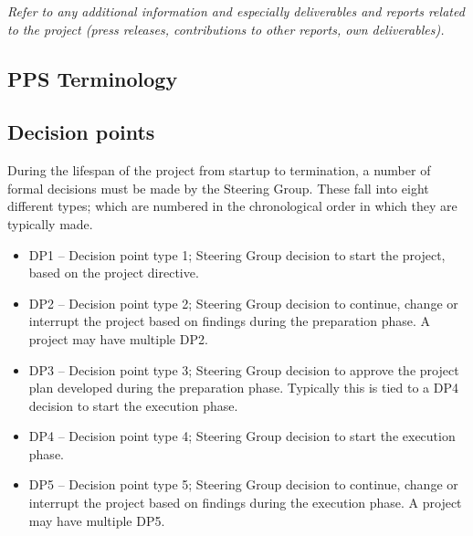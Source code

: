 \documentclass{article}
\begin{document}

\newpage
{\it Refer to any additional information and especially deliverables and reports related to the project (press releases, contributions to other reports, own deliverables).}
{}


\newpage
\begin{appendices}
\section{PPS Terminology}

\subsection{Decision points}
During the lifespan of the project from startup to termination, a number of formal decisions must be made by the Steering Group. These fall into eight different types; which are numbered in the chronological order in which they are typically made.
\begin{itemize}

\item DP1 – Decision point type 1; Steering Group decision to start the project, based on the project directive.

\item DP2 – Decision point type 2; Steering Group decision to continue, change or interrupt the project based on findings during the preparation phase. A project may have multiple DP2.

\item DP3 – Decision point type 3; Steering Group decision to approve the project plan developed during the preparation phase. Typically this is tied to a DP4 decision to start the execution phase.

\item DP4 – Decision point type 4; Steering Group decision to start the execution phase.

\item DP5 – Decision point type 5; Steering Group decision to continue, change or interrupt the project based on findings during the execution phase. A project may have multiple DP5.


\end{itemize}
\end{appendices}
\end{document}

